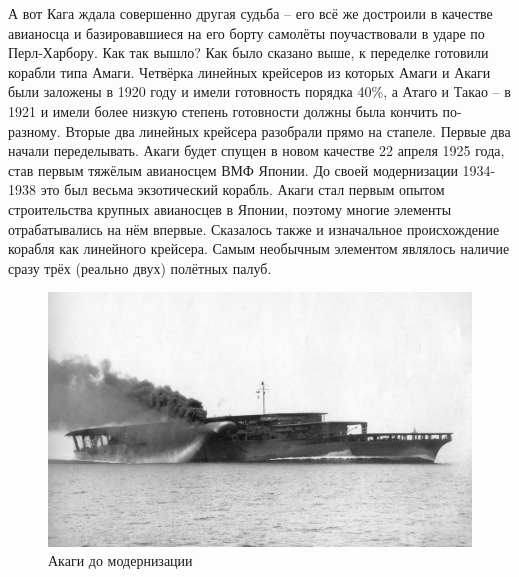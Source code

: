 А вот Кага ждала совершенно другая судьба – его всё же достроили в качестве авианосца и базировавшиеся на его борту самолёты поучаствовали в ударе по Перл-Харбору. Как так вышло? Как было сказано выше, к переделке готовили корабли типа Амаги. Четвёрка линейных крейсеров из которых Амаги и Акаги были заложены в 1920 году и имели готовность порядка 40\%, а Атаго и Такао – в 1921 и имели более низкую степень готовности должны была кончить по-разному. Вторые два линейных крейсера разобрали прямо на стапеле. Первые два начали переделывать. Акаги будет спущен в новом качестве 22 апреля 1925 года, став первым тяжёлым авианосцем ВМФ Японии. До своей модернизации 1934-1938 это был весьма экзотический корабль. Акаги стал первым опытом строительства крупных авианосцев в Японии, поэтому многие элементы отрабатывались на нём впервые. Сказалось также и изначальное происхождение корабля как линейного крейсера. Самым необычным элементом являлось наличие сразу трёх (реально двух) полётных палуб. 


\begin{figure}[h!tb] 
	\centering\includegraphics[scale=0.2]{Glava7/esXdRV6ZeqQ.jpg}
	\caption{Акаги до модернизации}%
\end{figure}


